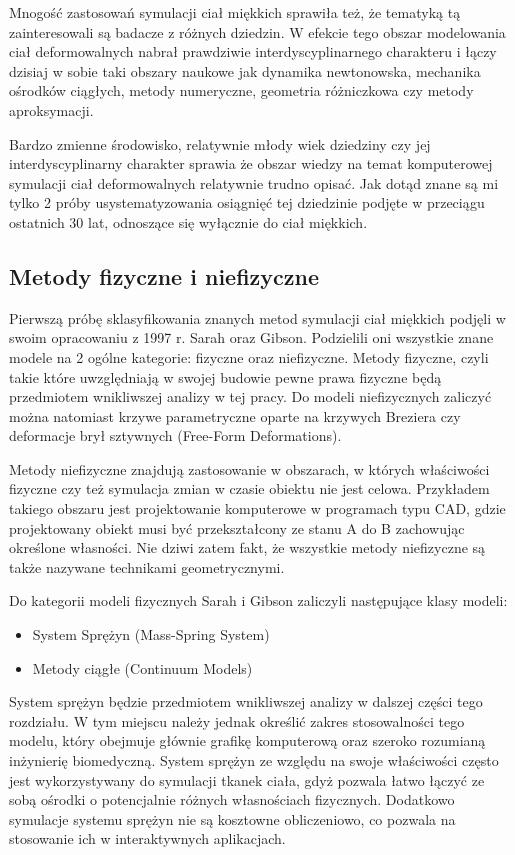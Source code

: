 Mnogość zastosowań symulacji ciał miękkich sprawiła też, że tematyką tą
zainteresowali są badacze z różnych dziedzin. W efekcie tego obszar modelowania ciał
deformowalnych nabrał prawdziwie interdyscyplinarnego charakteru i łączy dzisiaj w sobie
taki obszary naukowe jak dynamika newtonowska, mechanika ośrodków ciągłych,
metody numeryczne, geometria różniczkowa czy metody aproksymacji\cite{pbdo}.

Bardzo zmienne środowisko, relatywnie młody wiek dziedziny czy jej 
interdyscyplinarny charakter sprawia
że obszar wiedzy na temat komputerowej symulacji ciał deformowalnych relatywnie
trudno opisać.
Jak dotąd znane są mi tylko 2 próby usystematyzowania osiągnięć
tej dziedzinie podjęte w przeciągu ostatnich 30 lat, odnoszące się wyłącznie do
ciał miękkich.

\subsection{Metody fizyczne i niefizyczne}

Pierwszą próbę sklasyfikowania znanych metod symulacji ciał miękkich
podjęli w swoim opracowaniu z 1997 r. Sarah oraz Gibson\cite{TR97-19}. Podzielili
oni wszystkie znane modele na 2 ogólne kategorie: fizyczne oraz niefizyczne. Metody fizyczne, czyli
takie które uwzględniają w swojej budowie pewne prawa fizyczne będą przedmiotem
wnikliwszej analizy w tej pracy. Do modeli niefizycznych zaliczyć można natomiast
krzywe parametryczne oparte na krzywych Breziera czy deformacje brył sztywnych (Free-Form Deformations).\cite{pbdo}

Metody niefizyczne znajdują zastosowanie w obszarach, w których właściwości
fizyczne czy też symulacja zmian w czasie obiektu nie jest celowa. Przykładem
takiego obszaru jest projektowanie komputerowe w programach typu CAD, gdzie
projektowany obiekt musi być przekształcony ze stanu A do B zachowując określone
własności. Nie dziwi zatem fakt, że wszystkie metody niefizyczne są także 
nazywane technikami geometrycznymi.

Do kategorii modeli fizycznych Sarah i Gibson zaliczyli następujące klasy modeli:
\begin{itemize}
\item System Sprężyn (Mass-Spring System)
\item Metody ciągłe (Continuum Models)
\end{itemize}

System sprężyn będzie przedmiotem wnikliwszej analizy w dalszej części tego
rozdziału. W tym miejscu należy jednak określić zakres stosowalności tego
modelu, który obejmuje głównie grafikę komputerową oraz szeroko rozumianą
inżynierię biomedyczną. System sprężyn ze względu na swoje właściwości 
często jest wykorzystywany do symulacji tkanek ciała, gdyż pozwala łatwo łączyć ze
sobą ośrodki o potencjalnie różnych własnościach fizycznych. Dodatkowo symulacje
systemu sprężyn nie są kosztowne obliczeniowo, co pozwala na stosowanie ich w
interaktywnych aplikacjach.

